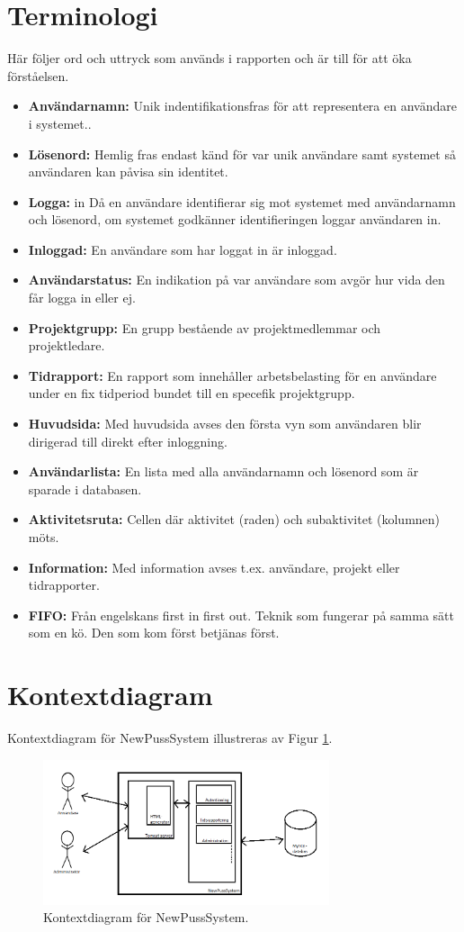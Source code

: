 \documentclass[a4paper]{article}
\begin{document}
\section{Terminologi}
\label{terminologi}
Här följer ord och uttryck som används i rapporten och är till för att öka förståelsen.
\begin{itemize}
\item []\textbf{Användarnamn:} Unik indentifikationsfras för att representera en användare i systemet..
\item []\textbf{Lösenord:} Hemlig fras endast känd för var unik användare samt systemet så användaren kan påvisa sin identitet.
\item []\textbf{Logga:} in Då en användare identifierar sig mot systemet med användarnamn och lösenord, om systemet godkänner identifieringen loggar användaren in.
\item []\textbf{Inloggad:} En användare som har loggat in är inloggad.
\item []\textbf{Användarstatus:} En indikation på var användare som avgör hur vida den får logga in eller ej.
\item []\textbf{Projektgrupp:} En grupp bestående av projektmedlemmar och projektledare.
\item []\textbf{Tidrapport:} En rapport som innehåller arbetsbelasting för en användare under en fix tidperiod bundet till en specefik projektgrupp.
\item []\textbf{Huvudsida:} Med huvudsida avses den första vyn som användaren blir dirigerad till direkt efter inloggning. 
\item []\textbf{Användarlista:} En lista med alla användarnamn och lösenord som är sparade i databasen.
\item []\textbf{Aktivitetsruta:} Cellen där aktivitet (raden) och subaktivitet (kolumnen) möts.
\item []\textbf{Information:} Med information avses t.ex. användare, projekt eller tidrapporter.
\item []\textbf{FIFO:} Från engelskans first in first out. Teknik som fungerar på samma sätt som en kö. Den som kom först betjänas först.

\end{itemize}
\section{Kontextdiagram}
Kontextdiagram för NewPussSystem illustreras av Figur \ref{image_kontext}.

\begin{figure}[h!]
  \centering
    \includegraphics[width=0.75\textwidth]{context}
   \caption{Kontextdiagram för NewPussSystem.}
   \label{image_kontext}
\end{figure}
\end{document}
